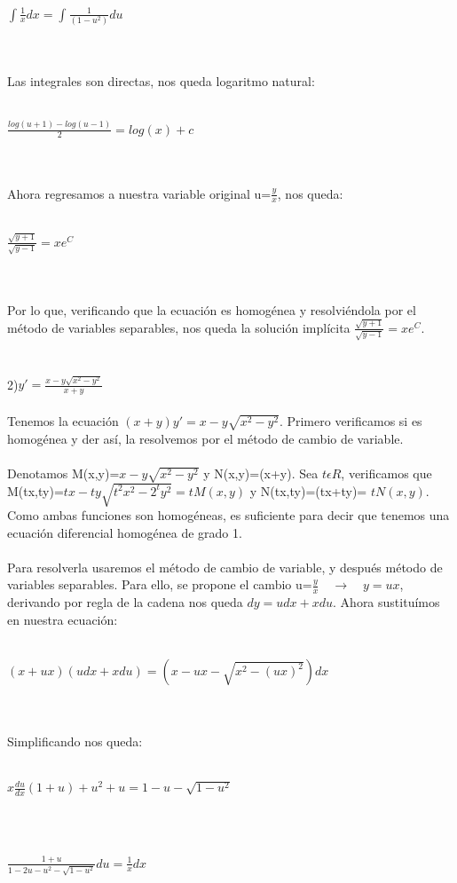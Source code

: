 \documentclass[a4paper,10pt]{article}
\begin{document}
\centerline{$\int \frac{1}{x} dx = \int \frac{1}{(1-u^2)}du$}\\\\
Las integrales son directas, nos queda logaritmo natural:\\\\
\centerline{$\frac{log(u+1) - log(u-1)}{2}=log(x)+c  $}\\\\
Ahora regresamos a nuestra variable original u=$\frac{y}{x}$, nos queda:\\\\
\centerline{$\frac{\sqrt{y+1}}{\sqrt{y-1}} = xe^C$}\\\\
Por lo que, verificando que la ecuación es homogénea y resolviéndola por el método de variables separables, nos queda la solución implícita $\frac{\sqrt{y+1}}{\sqrt{y-1}} = xe^C$.\\\\\\
2)$y'= \frac{x - y \sqrt{x^2 - y^2 }}{x+y}$\\\\
Tenemos la ecuación $(x+y)y'= x - y \sqrt{x^2 - y^2 }$. Primero verificamos si es homogénea y der así, la resolvemos por el método de cambio de variable.\\\\
Denotamos M(x,y)=$x - y \sqrt{x^2 - y^2 }$ y N(x,y)=(x+y). Sea $t\epsilon R$, verificamos que M(tx,ty)=$tx - ty \sqrt{t^2x^2 - 2^ty^2 } = t M(x,y)$ y N(tx,ty)=(tx+ty)= $t N(x,y)$. Como ambas funciones son homogéneas, es suficiente para decir que tenemos una ecuación diferencial homogénea de grado 1.\\\\
Para resolverla usaremos el método de cambio de variable, y después método de variables separables. Para ello, se propone el cambio u=$\frac{y}{x} \quad \rightarrow \quad y=ux$, derivando por regla de la cadena nos queda $dy= udx + xdu$. Ahora sustituímos en nuestra ecuación:\\\\
\centerline{$(x+ux)(udx + xdu)=(x - ux - \sqrt{x^2 - (ux)^2})dx$}\\\\
Simplificando nos queda:\\\\
\centerline{$x \frac{du}{dx}(1+u) + u^2  + u = 1- u -\sqrt{1-u^2}$}\\\\
\centerline{$ \frac{1+u}{1-2u-u^2- \sqrt{1-u^2}} du = \frac{1}{x} dx$}\\\\
\end{document}
